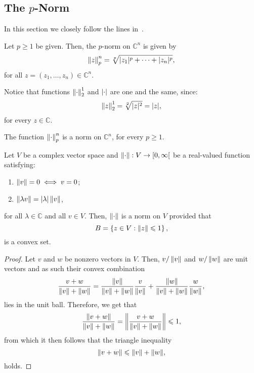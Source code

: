 \subsection{The \(p\)-Norm}\label{subsec:the-p-norm}

In this section we closely follow the lines in~\cite{yet_another_proof_of_minkowskis_inequality}.

\begin{definition}
  Let \(p\geqslant{1}\) be given. Then, the \(p\)-norm on \(\mathbb{C}^{n}\)
  is given by
  \[
    \left\lVert{z}\right\rVert^{n}_{p}
    =
    \sqrt[p]{\lvert{z_{1}}\rvert^{p}+\cdots+\lvert{z_{n}}\rvert^{p}},
  \]
  for all \(z=(z_{1},\ldots,z_{n})\in\mathbb{C}^{n}\).
\end{definition}

Notice that functions \(\left\lVert{\cdot}\right\rVert^{1}_{2}\) and \(\lvert{\cdot}\rvert\) are one and the same, since:
\[
  \left\lVert{z}\right\rVert^{1}_{2}=\sqrt[2]{\lvert{z}\rvert^{2}}=\lvert{z}\rvert,
\]
for every \(z\in{\mathbb{C}}\).

\begin{proposition}\label{proposition:the-p-norm-is-in-fact-a-norm}
  The function \(\left\lVert{\cdot}\right\rVert^{n}_{p}\) is a norm on \(\mathbb{C}^{n}\), for every \(p\geqslant{1}\).
\end{proposition}

\begin{lemma}\label{lemma:on-norms-and-the-convexity-of-the-unitary-closed-ball}
  Let \(V\) be a complex vector space and
  \(\norm{\cdot}:V\to\rinterval{0}{\infty}\) be a real-valued function
  satisfying:
  \begin{enumerate}
    \item
      \(\left\lVert{v}\right\rVert=0\iff{v=0}\);
    \item
      \(\left\lVert{\lambda{v}}\right\rVert=\lvert{\lambda}\rvert\left\lVert{v}\right\rVert\),
  \end{enumerate}
  for all \(\lambda\in{\mathbb{C}}\) and all \(v\in{V}\). Then,
  \(\left\lVert{\cdot}\right\rVert\) is a norm on \(V\) provided that
  \[
    B=\left\{z\in{V}:\left\lVert{z}\right\rVert\leqslant{1}\right\},
  \]
  is a convex set.
\end{lemma}

\begin{proof}
  Let \(v\) and \(w\) be nonzero vectors in \(V\). Then, \(v/\left\lVert{v}\right\rVert\) and
  \(w/\left\lVert{w}\right\rVert\) are unit vectors and as such their convex combination
  \[
    \frac{v+w}{\left\lVert{v}\right\rVert+\left\lVert{w}\right\rVert}
    =
    \frac{\left\lVert{v}\right\rVert}{\left\lVert{v}\right\rVert+\left\lVert{w}\right\rVert}\frac{v}{\left\lVert{v}\right\rVert}
    +
    \frac{\left\lVert{w}\right\rVert}{\left\lVert{v}\right\rVert+\left\lVert{w}\right\rVert}\frac{w}{\left\lVert{w}\right\rVert}
    ,
  \]
  lies in the unit ball. Therefore, we get that
  \[
    \frac{\left\lVert{v+w}\right\rVert}{\left\lVert{v}\right\rVert+\left\lVert{w}\right\rVert}
    =
    \left\lVert{\frac{v+w}{\left\lVert{v}\right\rVert+\left\lVert{w}\right\rVert}}\right\rVert\leqslant{1},
  \]
  from which it then follows that the triangle inequality
  \[
    \left\lVert{v+w}\right\rVert\leqslant{\left\lVert{v}\right\rVert+\left\lVert{w}\right\rVert},
  \]
  holds.
\end{proof}

